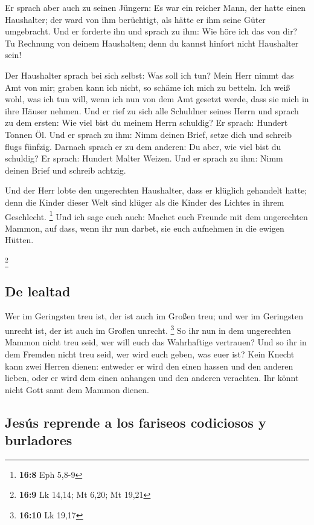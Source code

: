  Er sprach aber auch zu seinen Jüngern: Es war ein reicher
Mann, der hatte einen Haushalter; der ward von ihm berüchtigt, als hätte
er ihm seine Güter umgebracht.  Und er forderte ihn und
sprach zu ihm: Wie höre ich das von dir? Tu Rechnung von deinem
Haushalten; denn du kannst hinfort nicht Haushalter sein!

 Der Haushalter sprach bei sich selbst: Was soll ich tun?
Mein Herr nimmt das Amt von mir; graben kann ich nicht, so schäme ich
mich zu betteln.  Ich weiß wohl, was ich tun will, wenn
ich nun von dem Amt gesetzt werde, dass sie mich in ihre Häuser nehmen.
 Und er rief zu sich alle Schuldner seines Herrn und
sprach zu dem ersten: Wie viel bist du meinem Herrn schuldig?
 Er sprach: Hundert Tonnen Öl. Und er sprach zu ihm: Nimm
deinen Brief, setze dich und schreib flugs fünfzig. 
Darnach sprach er zu dem anderen: Du aber, wie viel bist du schuldig? Er
sprach: Hundert Malter Weizen. Und er sprach zu ihm: Nimm deinen Brief
und schreib achtzig.

 Und der Herr lobte den ungerechten Haushalter, dass er
klüglich gehandelt hatte; denn die Kinder dieser Welt sind klüger als
die Kinder des Lichtes in ihrem Geschlecht. \footnote{\textbf{16:8} Eph
  5,8-9}  Und ich sage euch auch: Machet euch Freunde mit
dem ungerechten Mammon, auf dass, wenn ihr nun darbet, sie euch
aufnehmen in die ewigen Hütten.

\footnote{\textbf{16:9} Lk 14,14; Mt 6,20; Mt 19,21}

\hypertarget{de-lealtad}{%
\subsection{De lealtad}\label{de-lealtad}}

 Wer im Geringsten treu ist, der ist auch im Großen treu;
und wer im Geringsten unrecht ist, der ist auch im Großen unrecht.
\footnote{\textbf{16:10} Lk 19,17}  So ihr nun in dem
ungerechten Mammon nicht treu seid, wer will euch das Wahrhaftige
vertrauen?  Und so ihr in dem Fremden nicht treu seid,
wer wird euch geben, was euer ist?  Kein Knecht kann zwei
Herren dienen: entweder er wird den einen hassen und den anderen lieben,
oder er wird dem einen anhangen und den anderen verachten. Ihr könnt
nicht Gott samt dem Mammon dienen.

\hypertarget{jesuxfas-reprende-a-los-fariseos-codiciosos-y-burladores}{%
\subsection{Jesús reprende a los fariseos codiciosos y
burladores}\label{jesuxfas-reprende-a-los-fariseos-codiciosos-y-burladores}}

